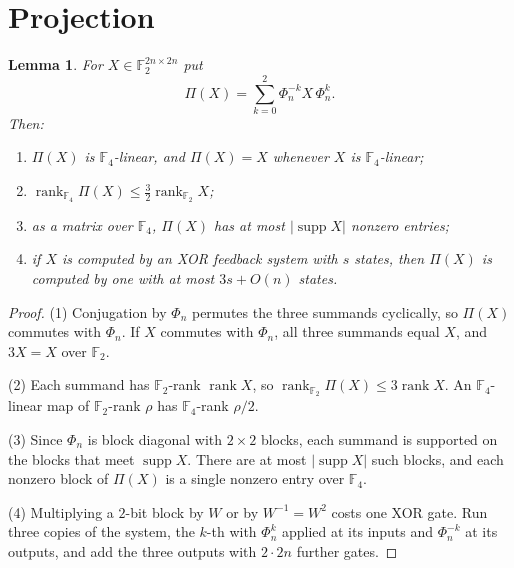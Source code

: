 \documentclass[11pt]{article}
\newtheorem{lemma}[theorem]{Lemma}
\theoremstyle{definition}
\theoremstyle{remark}
\newcommand{\F}{\mathbb{F}}
\newcommand{\supp}{\operatorname{supp}}
\newcommand{\rk}{\operatorname{rank}}
\begin{document}
\section{Projection}
\begin{lemma}\label{lem:proj}
For $X\in\F_2^{2n\times2n}$ put
\[
\Pi(X)=\sum_{k=0}^{2}\Phi_n^{-k}X\,\Phi_n^{k}.
\]
Then:
\begin{enumerate}
\item $\Pi(X)$ is $\F_4$-linear, and $\Pi(X)=X$ whenever $X$ is
$\F_4$-linear;
\item $\rk_{\F_4}\Pi(X)\le\tfrac32\rk_{\F_2}X$;
\item as a matrix over $\F_4$, $\Pi(X)$ has at most $|\supp X|$ nonzero
entries;
\item if $X$ is computed by an XOR feedback system with $s$ states, then
$\Pi(X)$ is computed by one with at most $3s+O(n)$ states.
\end{enumerate}
\end{lemma}

\begin{proof}
(1) Conjugation by $\Phi_n$ permutes the three summands cyclically, so
$\Pi(X)$ commutes with $\Phi_n$. If $X$ commutes with $\Phi_n$, all
three summands equal $X$, and $3X=X$ over $\F_2$.

(2) Each summand has $\F_2$-rank $\rk X$, so
$\rk_{\F_2}\Pi(X)\le3\rk X$. An $\F_4$-linear map of $\F_2$-rank $\rho$ has
$\F_4$-rank $\rho/2$.

(3) Since $\Phi_n$ is block diagonal with $2\times2$ blocks, each summand
is supported on the blocks that meet $\supp X$. There are at most
$|\supp X|$ such blocks, and each nonzero block of $\Pi(X)$ is a single
nonzero entry over $\F_4$.

(4) Multiplying a $2$-bit block by $W$ or by $W^{-1}=W^2$ costs one XOR
gate. Run three copies of the system, the $k$-th with $\Phi_n^k$ applied
at its inputs and $\Phi_n^{-k}$ at its outputs, and add the three
outputs with $2\cdot2n$ further gates.
\end{proof}
\end{document}
